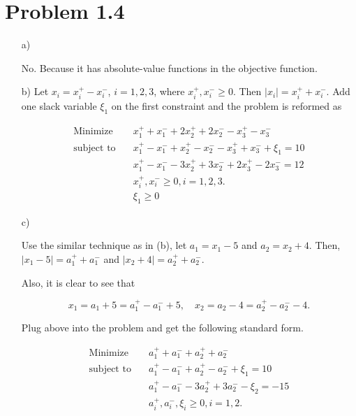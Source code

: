 \documentclass[12pt]{article}
\begin{document}
\section*{Problem 1.4}
\begin{enumerate}
\item[a)]

No. Because it has absolute-value functions in the objective function.

\item[b)]
Let $x_i = x_i^+ - x_i^-$, $i = 1, 2, 3$, where $x_i^+, x_i^- \geqslant 0$. Then $|x_i| = x_i^+ + x_i^-$. Add one slack variable $\xi_1$ on the first constraint and the problem is reformed as

\begin{equation*}
\begin{aligned}
\text{Minimize} \quad & x_1^+ + x_1^- + 2x_2^+ + 2x_2^- - x_3^+ - x_3^- \\
\text{subject\  to} \quad & x_1^+ - x_1^- + x_2^+ - x_2^- - x_3^+ + x_3^- + \xi_1 = 10 \\
& x_1^+ - x_1^- - 3x_2^+ + 3x_2^- + 2x_3^+ - 2x_3^- = 12 \\
& x_i^+, x_i^- \geqslant 0, i = 1, 2, 3. \\
& \xi_1 \geqslant 0
\end{aligned}
\end{equation*}

\item[c)]

Use the similar technique as in (b), let $a_1 = x_1 - 5$ and $a_2 = x_2 + 4$. Then, $|x_1 - 5| = a_1^+ + a_1^-$ and $ |x_2 + 4| = a_2^+ + a_2^-$. 

Also, it is clear to see that

$$
x_1 = a_1 + 5 = a_1^+ - a_1^- + 5, \quad x_2 = a_2 - 4 = a_2^+ - a_2^- - 4.
$$

Plug above into the problem and get the following standard form.

\begin{equation*}
\begin{aligned}
\text{Minimize} \quad & a_1^+ + a_1^- + a_2^+ + a_2^- \\
\text{subject\  to} \quad & a_1^+ - a_1^- + a_2^+ - a_2^- + \xi_1 = 10 \\
& a_1^+ - a_1^- - 3a_2^+ + 3a_2^- - \xi_2 = -15 \\
& a_i^+, a_i^-, \xi_i \geqslant 0, i = 1, 2. 
\end{aligned}
\end{equation*}
\end{enumerate}
\end{document}
